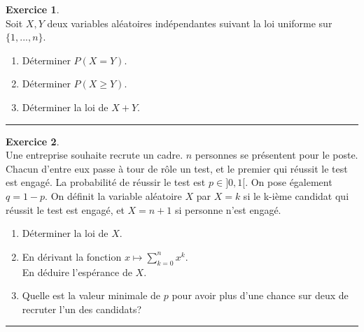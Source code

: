 \documentclass[a4paper,10pt]{article}
\theoremstyle{definition}
\theoremstyle{definition}
\newtheorem{exo}{Exercice}
\begin{document}
\begin{minipage}{1\linewidth}
\begin{minipage}[t]{0.48\linewidth}
		
	\end{minipage}	
	\hfill\vrule\hfill
	\begin{minipage}[t]{0.48\linewidth}
		\raggedright
		
					
	
		\begin{exo}\quad\\[0.2cm]
		Soit $X,Y$ deux variables aléatoires indépendantes suivant la loi uniforme sur $\{1,...,n\}$.
		\begin{enumerate}
			\item Déterminer $P(X=Y)$.
			\item Déterminer $P(X\geq Y)$.
			\item Déterminer la loi de $X+Y$.
		\end{enumerate}
		
		\centering
		\rule{1\linewidth}{0.6pt}
	\end{exo}
	
	\begin{exo}\quad\\[0.2cm]
		Une entreprise souhaite recrute un cadre. $n$ personnes se présentent pour le poste. Chacun d'entre eux passe à tour de rôle un test, et le premier qui réussit le test est engagé. La probabilité de réussir le test est $p\in ]0,1[$. On pose également $q=1-p$. On définit la variable aléatoire $X$ par $X=k$ si le k-ième candidat qui réussit le test est engagé, et $X=n+1$ si personne n'est engagé.
		\begin{enumerate}
			\item Déterminer la loi de $X$.
			\item En dérivant la fonction  $x\mapsto \sum_{k=0}^{n}x^k$.\\[0.1cm]
			En déduire l'espérance de $X$. 
			\item Quelle est la valeur minimale de $p$ pour avoir plus d'une chance sur deux de recruter l'un des candidats? 
		\end{enumerate}
		\centering
		\rule{1\linewidth}{0.6pt}
	\end{exo}	

	


		
			
		
		
	\end{minipage}
\end{minipage}	
\end{document}
